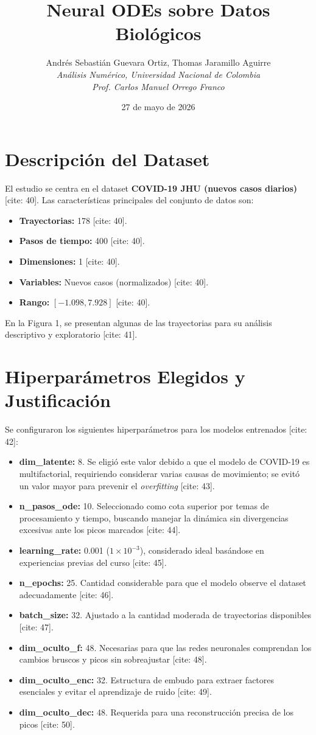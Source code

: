 \documentclass[twocolumn, 10pt]{article}
\title{\textbf{Neural ODEs sobre Datos Biológicos}}
\author{Andrés Sebastián Guevara Ortiz, Thomas Jaramillo Aguirre \\ \textit{Análisis Numérico, Universidad Nacional de Colombia} \\ \textit{Prof. Carlos Manuel Orrego Franco}}
\date{27 de mayo de 2026}
\begin{document}
\maketitle

\section{Descripción del Dataset}
El estudio se centra en el dataset \textbf{COVID-19 JHU (nuevos casos diarios)} [cite: 40]. Las características principales del conjunto de datos son:
\begin{itemize}
    \item \textbf{Trayectorias:} 178 [cite: 40].
    \item \textbf{Pasos de tiempo:} 400 [cite: 40].
    \item \textbf{Dimensiones:} 1 [cite: 40].
    \item \textbf{Variables:} Nuevos casos (normalizados) [cite: 40].
    \item \textbf{Rango:} $[-1.098, 7.928]$ [cite: 40].
\end{itemize}

En la Figura 1, se presentan algunas de las trayectorias para su análisis descriptivo y exploratorio [cite: 41].

\section{Hiperparámetros Elegidos y Justificación}
Se configuraron los siguientes hiperparámetros para los modelos entrenados [cite: 42]:
\begin{itemize}
    \item \textbf{dim\_latente:} 8. Se eligió este valor debido a que el modelo de COVID-19 es multifactorial, requiriendo considerar varias causas de movimiento; se evitó un valor mayor para prevenir el \textit{overfitting} [cite: 43].
    \item \textbf{n\_pasos\_ode:} 10. Seleccionado como cota superior por temas de procesamiento y tiempo, buscando manejar la dinámica sin divergencias excesivas ante los picos marcados [cite: 44].
    \item \textbf{learning\_rate:} 0.001 ($1 \times 10^{-3}$), considerado ideal basándose en experiencias previas del curso [cite: 45].
    \item \textbf{n\_epochs:} 25. Cantidad considerable para que el modelo observe el dataset adecuadamente [cite: 46].
    \item \textbf{batch\_size:} 32. Ajustado a la cantidad moderada de trayectorias disponibles [cite: 47].
    \item \textbf{dim\_oculto\_f:} 48. Necesarias para que las redes neuronales comprendan los cambios bruscos y picos sin sobreajustar [cite: 48].
    \item \textbf{dim\_oculto\_enc:} 32. Estructura de embudo para extraer factores esenciales y evitar el aprendizaje de ruido [cite: 49].
    \item \textbf{dim\_oculto\_dec:} 48. Requerida para una reconstrucción precisa de los picos [cite: 50].
\end{itemize}
\end{document}
